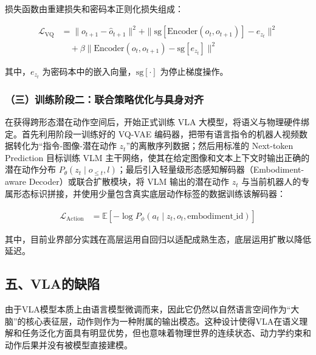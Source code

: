 损失函数由重建损失和密码本正则化损失组成：

\[
\begin{aligned}
\mathcal{L}_{\mathrm{VQ}}
&= \|o_{t+1}-\hat{o}_{t+1}\|^2
+\|\mathrm{sg}[\mathrm{Encoder}(o_t,o_{t+1})]-e_{z_t}\|^2
\\
&\quad+
\beta\|\mathrm{Encoder}(o_t,o_{t+1})-\mathrm{sg}[e_{z_t}]\|^2
\end{aligned}
\]

其中，\(e_{z_t}\) 为密码本中的嵌入向量，\(\mathrm{sg}[\cdot]\) 为停止梯度操作。

\hypertarget{ux4e09ux8badux7ec3ux9636ux6bb5ux4e8cux8054ux5408ux7b56ux7565ux4f18ux5316ux4e0eux5177ux8eabux5bf9ux9f50}{%
\subsubsection{（三）训练阶段二：联合策略优化与具身对齐}\label{ux4e09ux8badux7ec3ux9636ux6bb5ux4e8cux8054ux5408ux7b56ux7565ux4f18ux5316ux4e0eux5177ux8eabux5bf9ux9f50}}

在获得跨形态潜在动作空间后，开始正式训练 VLA 大模型，将语义与物理硬件绑定。首先利用阶段一训练好的 VQ-VAE 编码器，把带有语言指令的机器人视频数据转化为``指令-图像-潜在动作 \(z_t\)''的离散序列数据；然后用标准的 Next-token Prediction 目标训练 VLM 主干网络，使其在给定图像和文本上下文时输出正确的潜在动作分布 \(P_\theta(z_t\mid o_{\le t},l)\)；最后引入轻量级形态感知解码器（Embodiment-aware Decoder）或联合扩散模块，将 VLM 输出的潜在动作 \(z_t\) 与当前机器人的专属形态标识拼接，并使用少量包含真实底层动作标签的数据训练该解码器：

\[
\begin{aligned}
\mathcal{L}_{\mathrm{Action}}
&=
\mathbb{E}\left[
-\log P_\phi(a_t\mid z_t,o_t,\mathrm{embodiment\_id})
\right]
\end{aligned}
\]

其中，目前业界部分实践在高层运用自回归以适配成熟生态，底层运用扩散以降低延迟。

\hypertarget{ux4e94vlaux7684ux7f3aux9677}{%
\subsection{五、VLA的缺陷}\label{ux4e94vlaux7684ux7f3aux9677}}

由于VLA模型本质上由语言模型微调而来，因此它仍然以自然语言空间作为``大脑''的核心表征层，动作则作为一种附属的输出模态。这种设计使得VLA在语义理解和任务泛化方面具有明显优势，但也意味着物理世界的连续状态、动力学约束和动作后果并没有被模型直接建模。

